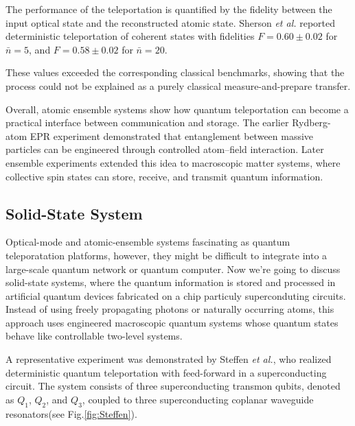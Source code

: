 \documentclass[aps,prd,preprint,floats,epsf,superscriptaddress,nofootinbib]{revtex4}
\begin{document}
The performance of the teleportation is quantified by the fidelity between the input optical state and the reconstructed atomic state. Sherson \textit{et al.}\cite{Sherson2006} reported deterministic teleportation of coherent states with fidelities
$F = 0.60 \pm 0.02$ for $\bar{n}=5$, and  $F = 0.58 \pm 0.02$ for $\bar{n}=20$.

These values exceeded the corresponding classical benchmarks, showing that the process could not be explained as a purely classical measure-and-prepare transfer.

Overall, atomic ensemble systems show how quantum teleportation can become a practical interface between communication and storage. The earlier Rydberg-atom EPR experiment demonstrated that entanglement between massive particles can be engineered through controlled atom--field interaction. Later ensemble experiments extended this idea to macroscopic matter systems, where collective spin states can store, receive, and transmit quantum information.


\subsection{Solid-State System}

Optical-mode and atomic-ensemble systems fascinating as quantum teleporatation platforms, however,
they might be difficult to integrate into a large-scale quantum network or quantum computer.
Now we're going to discuss solid-state systems, where the quantum information is stored and processed in artificial quantum devices fabricated on a chip particuly superconduting circuits.
Instead of using freely propagating photons or naturally occurring atoms, this approach uses engineered macroscopic quantum systems whose quantum states behave like controllable two-level systems.

A representative experiment was demonstrated by Steffen \textit{et al.}\cite{Steffen2013}, who realized deterministic quantum teleportation with feed-forward in a superconducting circuit.
The system consists of three superconducting transmon qubits, denoted as $Q_1$, $Q_2$, and $Q_3$, 
coupled to three superconducting coplanar waveguide resonators(see Fig.\ref{fig:Steffen}). 
\end{document}
